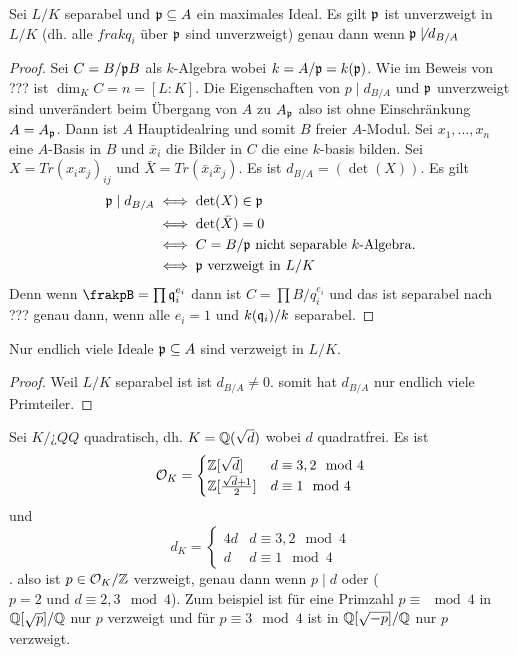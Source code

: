 \begin{Satz}
	Sei \(L/K\) separabel und \(\mathfrak{p}\subseteq A\) ein maximales Ideal. Es gilt
	\(\mathfrak{p}\) ist unverzweigt in \(L/K\) (dh. alle \(frakq_i\) über \(\mathfrak{p}\) sind unverzweigt) genau dann wenn \(\mathfrak{p}\not\mid d_{B/A}\)
\end{Satz}
\begin{proof}
	Sei \(C=B/\mathfrak{p} B\) als \(k\)-Algebra wobei \(k=A/\mathfrak{p}=k(\mathfrak{p})\).
	Wie im Beweis von ??? ist \(\dim_KC=n=[L:K]\).
	Die Eigenschaften von \(p\mid d_{B/A}\) und \(\mathfrak{p}\) unverzweigt sind unverändert beim Übergang von \(A\) zu \(A_{\mathfrak{p}}\) also ist ohne Einschränkung \(A=A_{\mathfrak{p}}\).
	Dann ist \(A\) Hauptidealring und somit \(B\) freier \(A\)-Modul.
	Sei \(x_1,\dots,x_n\) eine \(A\)-Basis in \(B\) und \(\bar x_i\) die Bilder in \(C\) die eine \(k\)-basis bilden.
	Sei \(X=Tr(x_ix_j)_{ij}\) und \(\bar X=Tr(\bar x_i\bar x_j)\).
	Es ist \(d_{B/A}=(\det(X))\).
	Es gilt 
	\begin{align*}
		\mathfrak{p} \mid d_{B/A}&\iff \det(X)\in\mathfrak{p}\\
		&\iff \det(\bar X)=0\\
		&\iff C=B/\mathfrak{p} \text{ nicht separable \(k\)-Algebra.}\\
		&\iff \mathfrak{p} \text{ verzweigt in } L/K
	\end{align*}
	Denn wenn \(\frakpB=\prod \frakq_i^{e_i}\) dann ist 
	\(C=\prod B/q_i^{e_i}\) und das ist separabel nach ???
	genau dann, wenn alle \(e_i=1\) und \(k(\mathfrak{q}_i)/k\) separabel.
\end{proof}
\begin{Kor}
	Nur endlich viele Ideale \(\mathfrak{p}\subseteq A\) sind verzweigt in \(L/K\).
\end{Kor}
\begin{proof}
	Weil \(L/K\) separabel ist ist \(d_{B/A}\neq 0\).
	somit hat \(d_{B/A}\) nur endlich viele Primteiler.
\end{proof}
\begin{Bsp}
	Sei \(K/¿QQ\) quadratisch, dh. \(K=\mathbb{Q}(\sqrt{d})\) wobei \(d\) quadratfrei.
		Es ist
		\[\mathcal{O}_K=\begin{cases}\mathbb{Z}[\sqrt{d}] & d\equiv 3,2 \mod 4\\ \mathbb{Z}[\frac{\sqrt{d}+1}{2}] & d\equiv 1 \mod 4\end{cases}\]
			und 
			\[d_K=\begin{cases} 4d & d\equiv 3,2 \mod 4 \\ d & d\equiv 1 \mod 4\end{cases}\].
		also ist \(p\in\mathcal{O}_K/\mathbb{Z}\) verzweigt, genau dann wenn 
		\(p\mid d\) oder (\(p=2 \text{ und } d\equiv 2,3\mod 4\)).
		Zum beispiel ist für eine Primzahl \(p\equiv\mod 4\) in \(\mathbb{Q}[\sqrt{p}]/\mathbb{Q}\) nur \(p\) verzweigt und für \(p\equiv 3\mod 4\) ist in \(\mathbb{Q}[\sqrt{-p}]/\mathbb{Q}\) nur \(p\) verzweigt.
\end{Bsp}

